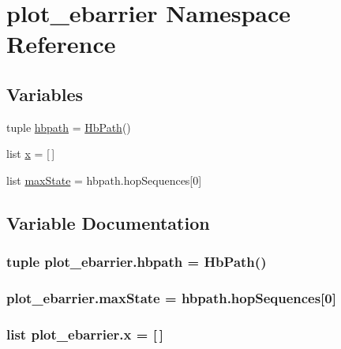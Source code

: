 \hypertarget{namespaceplot__ebarrier}{\section{plot\-\_\-ebarrier Namespace Reference}
\label{namespaceplot__ebarrier}
}
\subsection*{Variables}
\begin{DoxyCompactItemize}
\item 
tuple \hyperlink{namespaceplot__ebarrier_afbcad246ad6a07cba40b03ab6d0494e2}{hbpath} = \hyperlink{classhbnet_1_1_hb_path}{Hb\-Path}()
\item 
list \hyperlink{namespaceplot__ebarrier_a09a1ed66e94304740c510c47fe7f014e}{x} = \mbox{[}$\,$\mbox{]}
\item 
list \hyperlink{namespaceplot__ebarrier_a7aabdc0a37e703eedce936634b803158}{max\-State} = hbpath.\-hop\-Sequences\mbox{[}0\mbox{]}
\end{DoxyCompactItemize}


\subsection{Variable Documentation}
\hypertarget{namespaceplot__ebarrier_afbcad246ad6a07cba40b03ab6d0494e2}{
\subsubsection[{hbpath}]{\setlength{\rightskip}{0pt plus 5cm}tuple plot\-\_\-ebarrier.\-hbpath = {\bf Hb\-Path}()}}\label{namespaceplot__ebarrier_afbcad246ad6a07cba40b03ab6d0494e2}
\hypertarget{namespaceplot__ebarrier_a7aabdc0a37e703eedce936634b803158}{
\subsubsection[{max\-State}]{\setlength{\rightskip}{0pt plus 5cm}plot\-\_\-ebarrier.\-max\-State = hbpath.\-hop\-Sequences\mbox{[}0\mbox{]}}}\label{namespaceplot__ebarrier_a7aabdc0a37e703eedce936634b803158}
\hypertarget{namespaceplot__ebarrier_a09a1ed66e94304740c510c47fe7f014e}{
\subsubsection[{x}]{\setlength{\rightskip}{0pt plus 5cm}list plot\-\_\-ebarrier.\-x = \mbox{[}$\,$\mbox{]}}}\label{namespaceplot__ebarrier_a09a1ed66e94304740c510c47fe7f014e}
